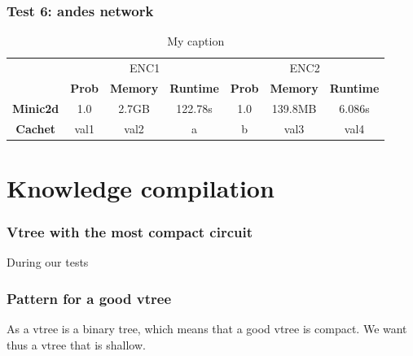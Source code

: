 \subsubsection{Test 6: andes network}
\begin{table}[H]
\centering
\caption{My caption}
\label{my-label}
\begin{tabular}{c|c|c|c|c|c|c|}
\cline{2-7}
        & \multicolumn{3}{c|}{ENC1} & \multicolumn{3}{c|}{ENC2} \\ \cline{2-7} 
  & \textbf{Prob}  & \textbf{Memory}  & \textbf{Runtime} & \textbf{Prob}  & \textbf{Memory}  & \textbf{Runtime} \\ \cline{1-7} 
  \textbf{Minic2d} & 1.0  & 2.7GB    & 122.78s   & 1.0    & 139.8MB    & 	6.086s \\
  \hline
\textbf{Cachet}  & val1  & val2    & a       & b     & val3    & val4    \\ \cline{1-7} 
\end{tabular}
\end{table}

\section{Knowledge compilation}
\subsubsection{Vtree with the most compact circuit}
During our tests 
\subsubsection{Pattern for a good vtree}
As a vtree is a binary tree, which means that a good vtree is compact. We want thus a vtree that is shallow. 
